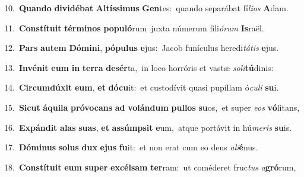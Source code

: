 {{\numbfont\textcolor{\numbcolor}{10.}}~\-\textbf{Quan}\-\textbf{do} \textbf{di}\-\textbf{vi}\textbf{dé}\textbf{bat} \textbf{Al}\-\textbf{tís}\textbf{si}\textbf{mus} \textbf{Gen}\-tes:~\star quando separábat fí\-\textit{li}\-\textit{os} \textbf{A}\-dam.\par
{\numbfont\textcolor{\numbcolor}{11.}}~\-\textbf{Con}\-\textbf{stí}\textbf{tu}\textbf{it} \textbf{tér}\-\textbf{mi}\textbf{nos} \textbf{po}\-\textbf{pu}\textbf{ló}rum~\star juxta númerum fili\-\textit{ó}\-\textit{rum} \textbf{Is}\-raël.\par
{\numbfont\textcolor{\numbcolor}{12.}}~\textbf{Pars} \textbf{au}\-\textbf{tem} \textbf{Dó}\-\textbf{mi}\textbf{ni}, \textbf{pó}\-\textbf{pu}\textbf{lus} \textbf{e}\-jus:~\star Jacob funículus heredi\-\textit{tá}\-\textit{tis} \textbf{e}\-jus.\par
{\numbfont\textcolor{\numbcolor}{13.}}~\-\textbf{In}\-\textbf{vé}\textbf{nit} \textbf{e}\-\textbf{um} \textbf{in} \textbf{ter}\-\textbf{ra} \textbf{de}\-\textbf{sér}ta,~\star in loco horróris et vastæ \textit{so}\-\textit{li}\textbf{tú}dinis:\par
{\numbfont\textcolor{\numbcolor}{14.}}~\-\textbf{Cir}\-\textbf{cum}\textbf{dú}\textbf{xit} \textbf{e}\-\textbf{um}, \textbf{et} \textbf{dó}\-\textbf{cu}it:~\star et custodívit quasi pupíllam ó\-\textit{cu}\-\textit{li} \textbf{su}\-i.\par
{\numbfont\textcolor{\numbcolor}{15.}}~\-\textbf{Sic}\-\textbf{ut} \textbf{á}\-\textbf{qui}\textbf{la} \textbf{pró}\-\textbf{vo}\textbf{cans} \textbf{ad} \textbf{vo}\-\textbf{lán}\textbf{dum} \textbf{pul}\-\textbf{los} \textbf{su}\-os,~\star et super \textit{e}\-\textit{os} \textbf{vó}\-litans,\par
{\numbfont\textcolor{\numbcolor}{16.}}~\-\textbf{Ex}\-\textbf{pán}\textbf{dit} \textbf{a}\-\textbf{las} \textbf{su}\-\textbf{as}, \textbf{et} \textbf{as}\-\textbf{súmp}\textbf{sit} \textbf{e}\-um,~\star atque portávit in hú\-\textit{me}\-\textit{ris} \textbf{su}\-is.\par
{\numbfont\textcolor{\numbcolor}{17.}}~\-\textbf{Dó}\-\textbf{mi}\textbf{nus} \textbf{so}\-\textbf{lus} \textbf{dux} \textbf{e}\-\textbf{jus} \textbf{fu}\-it:~\star et non erat cum eo deus \textit{a}\-\textit{li}\textbf{é}nus.\par
{\numbfont\textcolor{\numbcolor}{18.}}~\-\textbf{Con}\-\textbf{stí}\textbf{tu}\textbf{it} \textbf{e}\-\textbf{um} \textbf{su}\-\textbf{per} \textbf{ex}\-\textbf{cél}\textbf{sam} \textbf{ter}\-ram:~\star ut coméderet fruc\textit{tus} \textit{a}\-\textbf{gró}rum,\par
}
